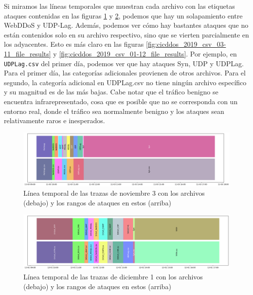 Si miramos las líneas temporales que muestran cada archivo con las etiquetas ataques contenidas en las figuras \ref{fig:cicddos_2019_csv_03-11_timeline} y \ref{fig:cicddos_2019_csv_01-12_timeline}, podemos  que hay un solapamiento entre WebDDoS y UDP-Lag. Además, podemos ver cómo hay bastantes ataques que no están contenidos solo en su archivo respectivo, sino que se vierten parcialmente en los adyacentes. Esto es más claro en las figuras \ref{fig:cicddos_2019_csv_03-11_file_results} y \ref{fig:cicddos_2019_csv_01-12_file_results}. Por ejemplo, en \texttt{UDPLag.csv} del primer día, podemos ver que hay ataques Syn, UDP y UDPLag. Para el primer día, las categorías adicionales provienen de otros archivos. Para el segundo, la categoría adicional en UDPLag.csv no tiene ningún archivo específico y su magnitud es de las más bajas. Cabe notar que el tráfico benigno se encuentra infrarepresentado, cosa que es posible que no se corresponda con un entorno real, donde el tráfico sea normalmente benigno y los ataques sean relativamente raros e inesperados.

\begin{figure}[H]
  \begin{center}
      \includegraphics[width=0.7\linewidth]{media/cicddos_2019_csv_03-11_timeline.png}
  \end{center}
  \captionsetup{justification=centering}
  \caption{Línea temporal de las trazas de noviembre 3 con los archivos (debajo) y los rangos de ataques en estos (arriba)}\label{fig:cicddos_2019_csv_03-11_timeline}
\end{figure}

\begin{figure}[!htb]
  \begin{center}
      \includegraphics[width=1\linewidth]{media/cicddos_2019_csv_01-12_timeline.png}
  \end{center}
  \captionsetup{justification=centering}
  \caption{Línea temporal de las trazas de diciembre 1 con los archivos (debajo) y los rangos de ataques en estos (arriba)}\label{fig:cicddos_2019_csv_01-12_timeline}
\end{figure}


